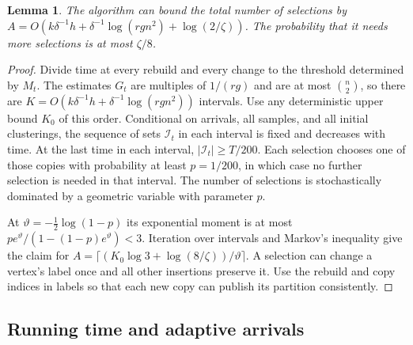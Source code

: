 \documentclass[11pt]{article}
\newtheorem{lemma}[theorem]{Lemma}
\begin{document}
\begin{lemma}\label{lem:online-recourse}
The algorithm can bound the total number of selections by
$A=O(k\delta^{-1}h+\delta^{-1}\log(rgn^2)+\log(2/\zeta))$.
The probability that it needs more selections is at most $\zeta/8$.
\end{lemma}
\begin{proof}
Divide time at every rebuild and every change to the threshold
determined by $M_t$. The estimates $G_t$ are multiples of $1/(rg)$ and are at most
$\binom n2$, so there are $K=O(k\delta^{-1}h+
\delta^{-1}\log(rgn^2))$ intervals. Use any deterministic upper bound
$K_0$ of this order. Conditional on arrivals, all samples, and all initial clusterings,
the sequence of sets $\mathcal I_t$ in each interval is fixed and
decreases with time.
At the last time in each interval, $|\mathcal I_t|\ge T/200$. Each selection chooses one
of those copies with probability
at least $p=1/200$, in which case no further selection is needed in
that interval. The number of selections is stochastically
dominated by a geometric variable with parameter $p$.

At $\vartheta=-\tfrac12\log(1-p)$ its exponential moment is at most
$p e^\vartheta/(1-(1-p)e^\vartheta)<3$. Iteration over intervals
and Markov's inequality give the claim for
$A=\lceil(K_0\log3+\log(8/\zeta))/\vartheta\rceil$.
A selection can change a vertex's label once and all other insertions
preserve it. Use the rebuild and copy indices in labels so that each
new copy can publish its partition consistently.
\end{proof}

\subsection{Running time and adaptive arrivals}
\end{document}
